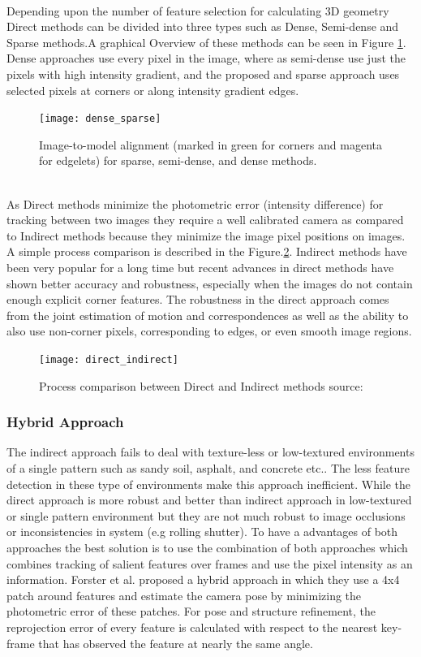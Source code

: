 \\ 
Depending upon the number of feature selection for calculating 3D geometry Direct methods can be divided into three types such as Dense, Semi-dense and Sparse methods.A graphical Overview of these methods can be seen in Figure \ref{fig:dense_sparse}. Dense approaches use every pixel in the image, where as semi-dense use just the pixels with high intensity gradient, and the proposed and sparse approach uses selected pixels at corners or along intensity gradient edges.\cite{engel14eccv}
\newline
\begin{figure}[h]
	\centering
	\texttt{[image: dense\_sparse]}
	\caption{Image-to-model alignment (marked in green for corners and magenta for
		edgelets) for sparse, semi-dense, and dense methods. \cite{7782863} }
	\label{fig:dense_sparse}
\end{figure}
\\
As Direct methods minimize the photometric error (intensity difference) for tracking between two images they require a well calibrated camera as compared to Indirect methods because they minimize the image pixel positions on images. A simple process comparison is described in the Figure.\ref{fig:direct_indirect}. Indirect methods have been very popular for a long time but recent advances in direct methods have shown better accuracy and robustness, especially when the images do not contain enough explicit corner features.\cite{Engel-et-al-pami2018} The robustness in the direct approach comes from the joint estimation of motion and correspondences as well as the ability to also use non-corner pixels, corresponding to edges, or even smooth image regions.\cite{gao2018ldso}
\begin{figure}[h]
	\centering
	\texttt{[image: direct\_indirect]}
	\caption{Process comparison between Direct and Indirect methods {source:\cite{engel14eccv}}}
	\label{fig:direct_indirect}
\end{figure}
\subsubsection{Hybrid Approach}
The indirect approach fails to deal with texture-less or low-textured environments of a single pattern such as sandy soil, asphalt, and concrete etc.. The less feature detection in these type of environments make this approach inefficient. While the direct approach is more robust and better than indirect approach in low-textured or single pattern environment but they are not much robust to image occlusions or inconsistencies in system (e.g rolling shutter). To have a advantages of both approaches the best solution is to use the combination of both approaches which combines tracking of salient features over frames and use the pixel intensity as an information\cite{Aqel-et-al-2016}. Forster et al.\cite{7782863} proposed a hybrid approach in which they use a 4x4 patch around features and estimate the camera pose by minimizing the photometric error of these patches. For pose and structure refinement, the reprojection error of every feature is calculated with respect to the nearest key-frame that has observed the feature at nearly the same angle.


